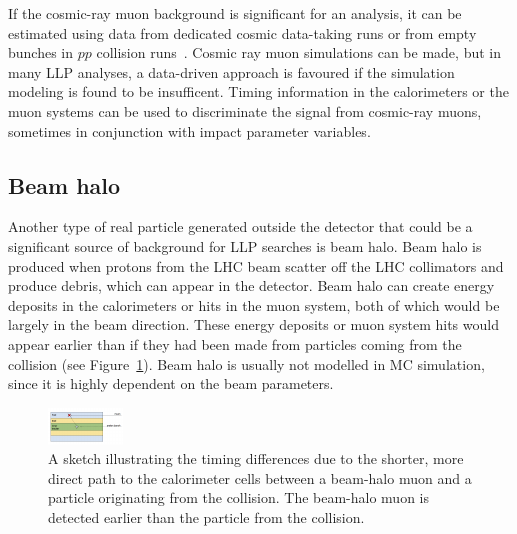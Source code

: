 If the cosmic-ray muon background is significant for an analysis, it can be estimated using data from dedicated cosmic data-taking runs or from empty bunches in $pp$ collision runs~\cite{Khachatryan:2015jha, Chatrchyan:2012dxa, Khachatryan:2010uf}. Cosmic ray muon simulations can be made, but in many LLP analyses, a data-driven approach is favoured if the simulation modeling is found to be insufficent. Timing information in the calorimeters or the muon systems can be used to discriminate the signal from cosmic-ray muons, sometimes in conjunction with impact parameter variables.

\subsection{Beam halo} %

Another type of real particle generated outside the detector that could be a significant source of background for LLP searches is beam halo. Beam halo is produced when protons from the LHC beam scatter off the LHC collimators and produce debris, which can appear in the detector. Beam halo can create energy deposits in the calorimeters or hits in the muon system, both of which would be largely in the beam direction. These energy deposits or muon system hits would appear earlier than if they had been made from particles coming from the collision (see Figure~\ref{fig:beamHaloSketch}). Beam halo is usually not modelled in MC simulation, since it is highly dependent on the beam parameters.

\begin{figure}[t]
  \centering
  \includegraphics[width=\textwidth]{figures/beamHaloSketch.pdf}
  \caption{A sketch illustrating the timing differences due to the shorter, more direct path to the calorimeter cells between a beam-halo muon and a particle originating from the collision. The beam-halo muon is detected earlier than the particle from the collision.}
  \label{fig:beamHaloSketch}
\end{figure}

